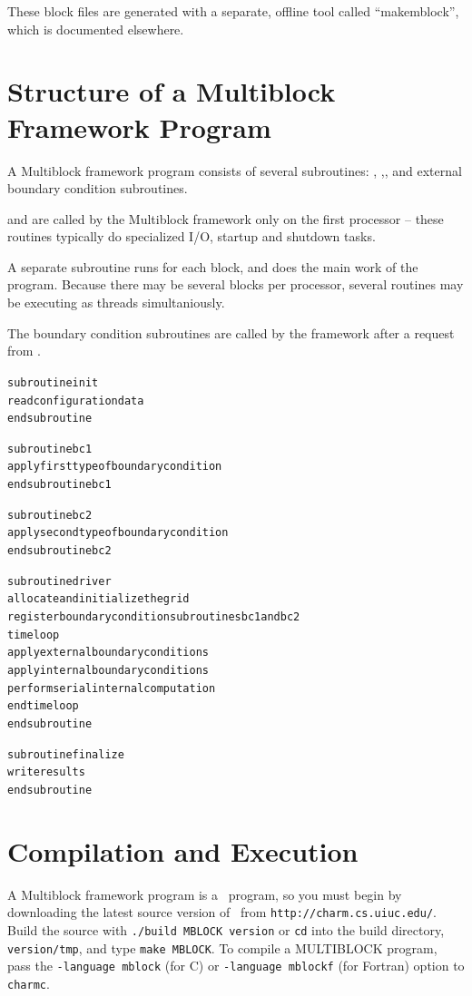 \documentclass[10pt]{article}
\begin{document}
These block files are generated with a separate, offline tool
called ``makemblock'', which is documented elsewhere.

\section{Structure of a Multiblock Framework Program}

A Multiblock framework program consists of several subroutines: , ,, and external boundary condition subroutines.  

 and  are called by the Multiblock framework only on the first processor -- these routines typically do specialized I/O, startup and shutdown tasks.  

A separate  subroutine runs for each block, and does the main work of the program.  Because there may be several blocks per processor, several  routines may be executing as threads simultaniously.  

The boundary condition subroutines are called by the framework after a 
request from .


\begin{alltt}
     subroutine init
          read configuration data
     end subroutine

     subroutine bc1
          apply first type of boundary condition
     end subroutine bc1

     subroutine bc2
          apply second type of boundary condition
     end subroutine bc2

     subroutine driver
          allocate and initialize the grid
          register boundary condition subroutines bc1 and bc2
          time loop
               apply external boundary conditions
               apply internal boundary conditions
               perform serial internal computation
          end time loop
     end subroutine

     subroutine finalize
           write results
     end subroutine
\end{alltt}



\section{Compilation and Execution}

A Multiblock framework program is a \charmpp\ program, so you must begin by
downloading the latest source version of \charmpp\ from
{\tt http://charm.cs.uiuc.edu/}.  Build the source with 
{\tt ./build MBLOCK version} or {\tt cd} into the build directory, 
{\tt version/tmp}, and type {\tt make MBLOCK}.
To compile a MULTIBLOCK program, pass the {\tt -language mblock} (for C) or 
{\tt -language mblockf} (for Fortran) option to {\tt charmc}.
\end{document}

